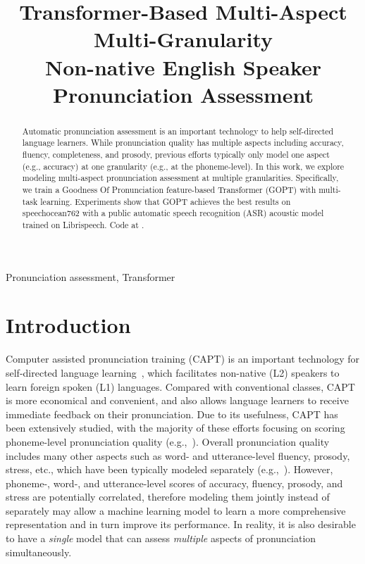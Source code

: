 \documentclass{article}
\title{Transformer-Based Multi-Aspect Multi-Granularity \\ Non-native English Speaker Pronunciation Assessment}
\newcommand{\squeezeup}{\vspace{-1.6mm}}
\begin{document}
\maketitle
\begin{abstract}
Automatic pronunciation assessment is an important technology to help self-directed language learners. While pronunciation quality has multiple aspects including accuracy, fluency, completeness, and prosody, previous efforts typically only model one aspect (e.g., accuracy) at one granularity (e.g., at the phoneme-level). In this work, we explore modeling multi-aspect pronunciation assessment at multiple granularities. Specifically, we train a Goodness Of Pronunciation feature-based Transformer (GOPT) with multi-task learning. Experiments show that GOPT achieves the best results on speechocean762 with a public automatic speech recognition (ASR) acoustic model trained on Librispeech. Code at \href{https://github.com/YuanGongND/gopt}{\color{blue}{https://github.com/YuanGongND/gopt}}.
\end{abstract}
\begin{keywords}
Pronunciation assessment, Transformer
\end{keywords}

\squeezeup\squeezeup
\section{Introduction}
\squeezeup
\label{sec:intro}
Computer assisted pronunciation training (CAPT) is an important technology for self-directed language learning~\cite{Eskenazi2009review, Zechner2009SpeechRater,witt2012automatic}, which facilitates non-native (L2) speakers to learn foreign spoken (L1) languages. Compared with conventional classes, CAPT is more economical and convenient, and also allows language learners to receive immediate feedback on their pronunciation. Due to its usefulness, CAPT has been extensively studied, with the majority of these efforts focusing on scoring phoneme-level pronunciation quality (e.g.,~\cite{Witt2000GOP,zhang2008automatic,luo2009analysis,wang2012improved,hu2015improved,Shi2020ContextawareGOP,van2010using}).  Overall pronunciation quality includes many other aspects such as word- and utterance-level fluency, prosody, stress, etc., which have been typically modeled separately (e.g.,~\cite{cucchiarini1998quantitative,cucchiarini2000quantitative,bagshaw1994automatic,tepperman2005automatic,arias2010automatic, LI2017innotation}). However, phoneme-, word-, and utterance-level scores of accuracy, fluency, prosody, and stress are potentially correlated, therefore modeling them jointly instead of separately may allow a machine learning model to learn a more comprehensive representation and in turn improve its performance. In reality, it is also desirable to have a \emph{single} model that can assess \emph{multiple} aspects of pronunciation simultaneously.
\end{document}

